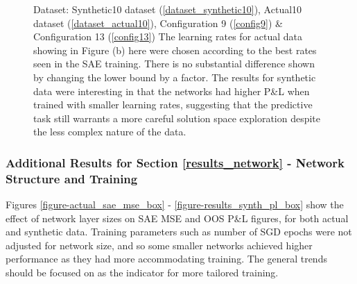 \documentclass[a4paper,11pt,oneside]{article}
\theoremstyle{plain}
\theoremstyle{definition}
\begin{document}
\begin{figure}[H]
\begin{subfigure}{.5\textwidth}
{				\newline }
			\label{figure-actual_pl_minmax_lr}
		\end{subfigure}
		\caption[P\&L by Learning Rates]{Dataset: Synthetic10 dataset (\ref{dataset_synthetic10}), Actual10 dataset (\ref{dataset_actual10}), Configuration 9 (\ref{config9}) \& Configuration 13 (\ref{config13})
			\newline The learning rates for actual data showing in Figure (b) here were chosen according to the best rates seen in the SAE training. There is no substantial difference shown by changing the lower bound by a factor. The results for synthetic data were interesting in that the networks had higher P\&L when trained with smaller learning rates, suggesting that the predictive task still warrants a more careful solution space exploration despite the less complex nature of the data.}
		\label{figure-pl_lr}
	\end{figure}
	
	
	
	
	
	
	
	
	
	\subsubsection{Additional Results for Section \ref{results_network} - Network Structure and Training }\label{results_network_appendix}
	
	Figures \ref{figure-actual_sae_mse_box} - \ref{figure-results_synth_pl_box} show the effect of network layer sizes on SAE MSE and OOS P\&L figures, for both actual and synthetic data. Training parameters such as number of SGD epochs were not adjusted for network size, and so some smaller networks achieved higher performance as they had more accommodating training. The general trends should be focused on as the indicator for more tailored training.
	
\end{document}
